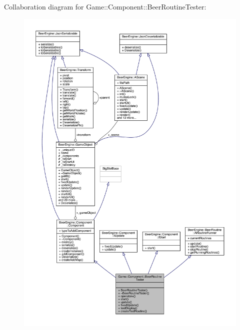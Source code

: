 Collaboration diagram for Game\+:\+:Component\+:\+:Beer\+Routine\+Tester\+:
\nopagebreak
\begin{figure}[H]
\begin{center}
\leavevmode
\includegraphics[width=350pt]{class_game_1_1_component_1_1_beer_routine_tester__coll__graph}
\end{center}
\end{figure}
